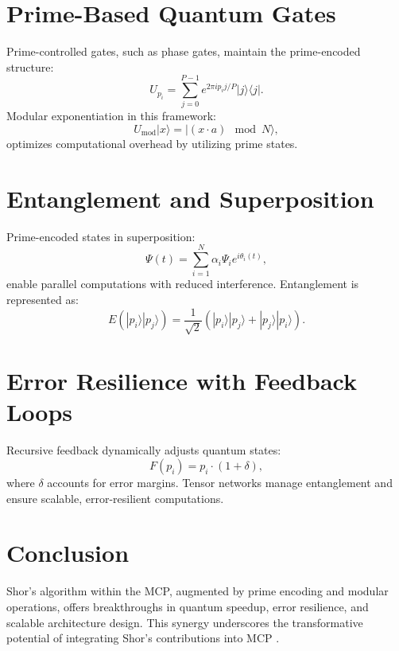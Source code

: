 \documentclass{article}
\theoremstyle{plain}
\begin{document}
\section{Prime-Based Quantum Gates}
Prime-controlled gates, such as phase gates, maintain the prime-encoded structure:
\begin{equation}
U_{p_i} = \sum_{j=0}^{P-1} e^{2\pi i p_i j / P} |j\rangle \langle j|.
\end{equation}
Modular exponentiation in this framework:
\begin{equation}
U_{\text{mod}} |x\rangle = |(x \cdot a) \mod N\rangle,
\end{equation}
optimizes computational overhead by utilizing prime states.

\section{Entanglement and Superposition}
Prime-encoded states in superposition:
\begin{equation}
\Psi(t) = \sum_{i=1}^N \alpha_i \Psi_i e^{i\theta_i(t)},
\end{equation}
enable parallel computations with reduced interference. Entanglement is represented as:
\begin{equation}
E(|p_i\rangle |p_j\rangle) = \frac{1}{\sqrt{2}} \left(|p_i\rangle |p_j\rangle + |p_j\rangle |p_i\rangle\right).
\end{equation}

\section{Error Resilience with Feedback Loops}
Recursive feedback dynamically adjusts quantum states:
\begin{equation}
F(p_i) = p_i \cdot (1 + \delta),
\end{equation}
where $\delta$ accounts for error margins. Tensor networks manage entanglement and ensure scalable, error-resilient computations.

\section{Conclusion}
Shor’s algorithm within the MCP, augmented by prime encoding and modular operations, offers breakthroughs in quantum speedup, error resilience, and scalable architecture design. This synergy underscores the transformative potential of integrating Shor's contributions into MCP \cite{nielsen2010quantum, preskill2018quantum}.



\end{document}
